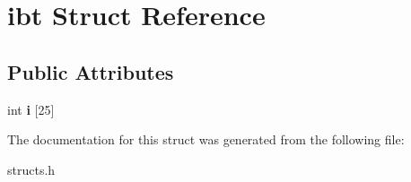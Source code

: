 \hypertarget{structibt}{\section{ibt Struct Reference}
\label{structibt}
}
\subsection*{Public Attributes}
\begin{DoxyCompactItemize}
\item 
\hypertarget{structibt_a32818b983a09bcb424dc4bff414b2b48}{int {\bfseries i} \mbox{[}25\mbox{]}}\label{structibt_a32818b983a09bcb424dc4bff414b2b48}

\end{DoxyCompactItemize}


The documentation for this struct was generated from the following file\-:\begin{DoxyCompactItemize}
\item 
structs.\-h\end{DoxyCompactItemize}
